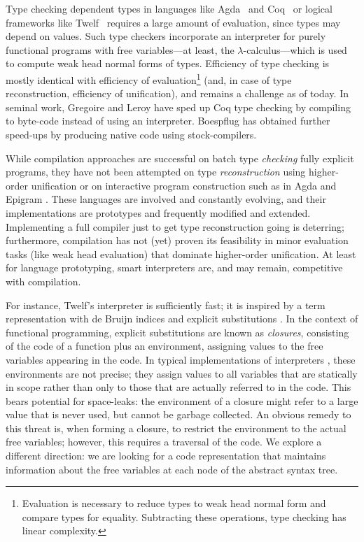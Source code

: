 \documentclass[submission,copyright,creativecommons]{eptcs}
\begin{document}
Type checking dependent types in languages like Agda~\cite{norell:PhD}
and Coq~\cite{inria:coq83} or logical frameworks like Twelf~\cite{carsten:twelf}
requires a large amount of evaluation, since types may depend on
values.  Such type checkers incorporate
an interpreter for purely functional programs with free variables---at least, the
$\lambda$-calculus---which is used to compute weak head normal forms
of types.  Efficiency of type checking is mostly identical with
efficiency of evaluation\footnote{Evaluation is necessary to reduce
  types to weak head normal form and compare types for equality.
  Subtracting these operations, type checking has linear complexity.
} 
(and, in case of type reconstruction,
efficiency of unification), and remains a challenge as of today.  
In seminal work, Gregoire and Leroy \cite{gregoireLeroy:icfp02} have
sped up Coq type checking by compiling to byte-code instead of
using an interpreter.  Boespflug \cite{boespflug:padl10} has obtained
further speed-ups by producing native code using stock-compilers.  

While compilation approaches are successful on batch type \emph{checking}
fully explicit programs, they have not been attempted on type
\emph{reconstruction} using higher-order unification or on interactive
program construction such as in Agda and Epigram \cite{mcBrideMcKinna:view}.
These languages are involved and constantly evolving, 
and their implementations are
prototypes and frequently modified and extended.  Implementing a
full compiler just to get type reconstruction going is deterring;
furthermore, compilation has not (yet) proven its feasibility in minor
evaluation tasks (like weak head evaluation)
that dominate higher-order unification.  
At least for language prototyping, smart
interpreters are, and may remain, competitive with compilation.  

For instance, Twelf's interpreter is sufficiently fast; it is 
inspired by a term representation with de Bruijn indices 
\cite{deBruijn:nameless} and explicit substitutions 
\cite{abadiCardelliCurienLevy:jfp91}.  In the context of functional
programming, explicit substitutions are known as \emph{closures},
consisting of the code of a function plus an environment, assigning
values to the free variables appearing in the code.  
In typical implementations of interpreters \cite{coquand:type}, 
these environments are not
precise; they assign values to all variables that are statically in
scope rather than only to those that are actually referred to in the
code.  This bears potential for space-leaks: the environment of a
closure might refer to a large value that is never used, but cannot be
garbage collected.  An obvious remedy to this threat is, when forming
a closure, to restrict the environment to the actual free variables;
however, this requires a traversal of the code.  We explore a
different direction: we are looking for a code representation that
maintains information about the free variables at each node of the
abstract syntax tree.
\end{document}
